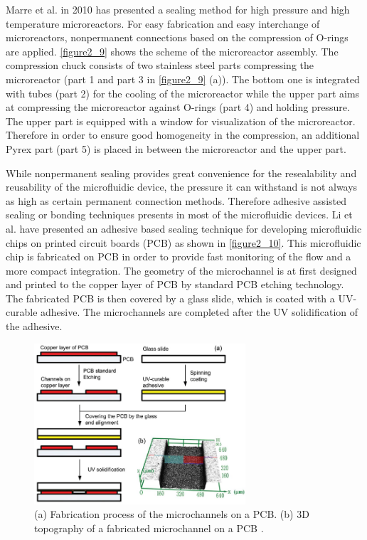 Marre et al. \cite{marre2010design} in 2010 has presented a sealing method for high pressure and high temperature microreactors. For easy fabrication and easy interchange of microreactors, nonpermanent connections based on the compression of O-rings are applied. \autoref{figure2_9} shows the scheme of the microreactor assembly. The compression chuck consists of two stainless steel parts compressing the microreactor (part 1 and part 3 in \autoref{figure2_9} (a)). The bottom one is integrated with tubes (part 2) for the cooling of the microreactor while the upper part aims at compressing the microreactor against O-rings (part 4) and holding pressure. The upper part is equipped with a window for visualization of the microreactor. Therefore in order to ensure good homogeneity in the compression, an additional Pyrex part (part 5) is placed in between the microreactor and the upper part.

While nonpermanent sealing provides great convenience for the resealability and reusability of the microfluidic device, the pressure it can withstand is not always as high as certain permanent connection methods. Therefore adhesive assisted sealing or bonding techniques presents in most of the microfluidic devices. Li et al. \cite{li2014usb} have presented an adhesive based sealing technique for developing microfluidic chips on printed circuit boards (PCB) as shown in \autoref{figure2_10}. This microfluidic chip is fabricated on PCB in order to provide fast monitoring of the flow and a more compact integration. The geometry of the microchannel is at first designed and printed to the copper layer of PCB by standard PCB etching technology. The fabricated PCB is then covered by a glass slide, which is coated with a UV-curable adhesive. The microchannels are completed after the UV solidification of the adhesive.

\begin{figure}[ht]%
\centering
\includegraphics[width=0.7\textwidth]{figures/literaturereview/figure2_10}%
\caption{(a) Fabrication process of the microchannels on a PCB. (b) 3D topography of a fabricated microchannel on a PCB \cite{li2014usb}.}%
\label{figure2_10}%
\end{figure}













